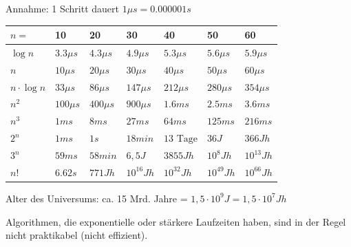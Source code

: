 \documentclass{beamer}
\begin{document}
\begin{frame}[fragile]

Annahme: 1 Schritt dauert $1 \mu s = 0.000001 s$

\begin{tabular}{l | l l l l l l}
$n =   $   &   10 & 20 & 30 & 40 & 50 & 60 \\
\hline
$\log n$ & $3.3\mu s$  & $4.3\mu s$ & $4.9\mu s$  & $5.3\mu s$ & $5.6\mu s$ &  $5.9\mu s$ \\ \pause
$n$ & $10\mu s$  & $20\mu s$ & $30\mu s$  & $40\mu s$ & $50\mu s$ &  $60\mu s$ \\ \pause
$n \cdot \log n $ & $33\mu s$  & $86\mu s$ & $147\mu s$  & $212\mu s$ & $280\mu s$ &  $354\mu s$ \\ \pause
$n^2  $ & $100\mu s$  & $400\mu s$ & $900\mu s$  & $1.6ms $ & $2.5ms$ &  $3.6 ms$ \\ \pause
$n^3  $ & $1ms$  & $8ms$ & $27ms$  & $64ms $ & $125ms$ &  $216 ms$ \pause \\ 
\hline
$2^n  $ & $1ms$  & $1s$ & $18min$  & $13\text{ Tage}$ & $36 J$ &  $366Jh$ \\ \pause
$3^n  $ & $59ms$  & $58min$ & $6,5J$  & $3855Jh$ & $10^8 Jh$ &  $10^{13} Jh$ \\ \pause
$n!  $ & $6.62s $  & $771 Jh$ & $10^{16} Jh$  &  $10^{32} Jh$ &  $10^{49} Jh$ &  $10^{66} Jh$ \\
\hline
\end{tabular} 


Alter des Universums: ca. 15 Mrd. Jahre =   $ 1,5 \cdot 10^9 J =   1,5 \cdot 10^7 Jh$  

Algorithmen, die exponentielle oder stärkere Laufzeiten haben, sind in der Regel nicht praktikabel (nicht effizient).

\end{frame}
\end{document}
